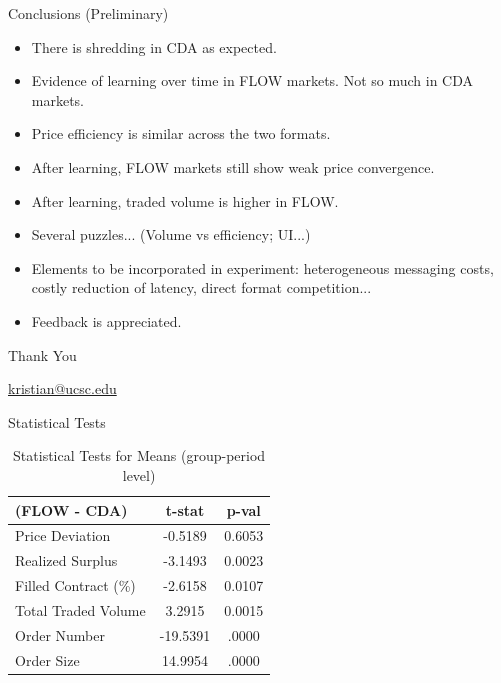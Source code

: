 \documentclass[10pt]{beamer}
\begin{document}
\begin{frame}{Conclusions (Preliminary)}
    \begin{itemize}
    \item There is shredding in CDA as expected.
    \item Evidence of learning over time in FLOW markets. Not so much in CDA markets.
    \item Price efficiency is similar across the two formats.
    \item After learning, FLOW markets still show weak price convergence.
    \item After learning, traded volume is higher in FLOW.
    \item Several puzzles... (Volume vs efficiency; UI...)
    \item Elements to be incorporated in experiment: heterogeneous messaging costs, costly reduction of latency, direct format competition...
    \item Feedback is appreciated.
    \end{itemize} 
\end{frame}

\begin{frame}
\Huge{\centerline{Thank You}}
\vspace{1cm}
\small{\centerline{\url{kristian@ucsc.edu}}}
\end{frame}


\appendix

\begin{frame}{Statistical Tests}
    \begin{table}[H]
        \footnotesize
        \centering
        \begin{tabular}{lcc}
            \hline 
            \hline
            (FLOW - CDA) & t-stat & p-val \\
            \hline
            Price Deviation & -0.5189 & 0.6053 \\
            Realized Surplus & -3.1493 & 0.0023 \\
            Filled Contract (\%) & -2.6158 & 0.0107 \\
            Total Traded Volume & 3.2915 & 0.0015 \\
            Order Number & -19.5391 & .0000 \\
            Order Size & 14.9954 & .0000 \\
            \hline
            \hline
        \end{tabular}
        \caption{Statistical Tests for Means (group-period level) }
        \label{tab:stat_tests}
    \end{table}
\end{frame}
\end{document}
